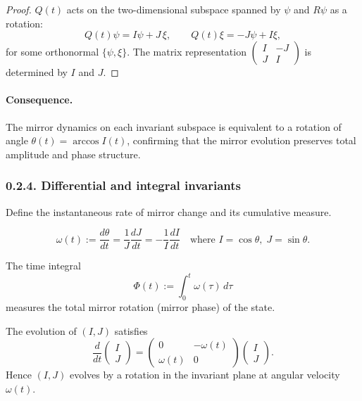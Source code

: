 \begin{proof}
$Q(t)$ acts on the two-dimensional subspace spanned by $\psi$ and $R\psi$ as a rotation:
\[
Q(t)\psi = I\psi + J\,\xi,\qquad Q(t)\xi = -J\psi + I\xi,
\]
for some orthonormal $\{\psi,\xi\}$.
The matrix representation
$\begin{pmatrix}I & -J\\J & I\end{pmatrix}$
is determined by $I$ and $J$.
\end{proof}

\paragraph{Consequence.}
The mirror dynamics on each invariant subspace is equivalent to a rotation of angle $\theta(t)=\arccos I(t)$, confirming that the mirror evolution preserves total amplitude and phase structure.

\subsubsection*{0.2.4. Differential and integral invariants}

Define the instantaneous rate of mirror change and its cumulative measure.

\begin{definition}
\[
\omega(t):=\frac{d\theta}{dt}
=\frac{1}{J}\frac{dJ}{dt}=-\frac{1}{I}\frac{dI}{dt}
\quad \text{where } I=\cos\theta,\;J=\sin\theta.
\]
\end{definition}

\begin{lemma}
The time integral
\[
\Phi(t):=\int_0^t \omega(\tau)\,d\tau
\]
measures the total mirror rotation (mirror phase) of the state.
\end{lemma}

\begin{proposition}
The evolution of $(I,J)$ satisfies
\[
\frac{d}{dt}
\begin{pmatrix}
I\\J
\end{pmatrix}
=
\begin{pmatrix}
0 & -\omega(t)\\
\omega(t) & 0
\end{pmatrix}
\begin{pmatrix}
I\\J
\end{pmatrix}.
\]
Hence $(I,J)$ evolves by a rotation in the invariant plane at angular velocity $\omega(t)$.
\end{proposition}

